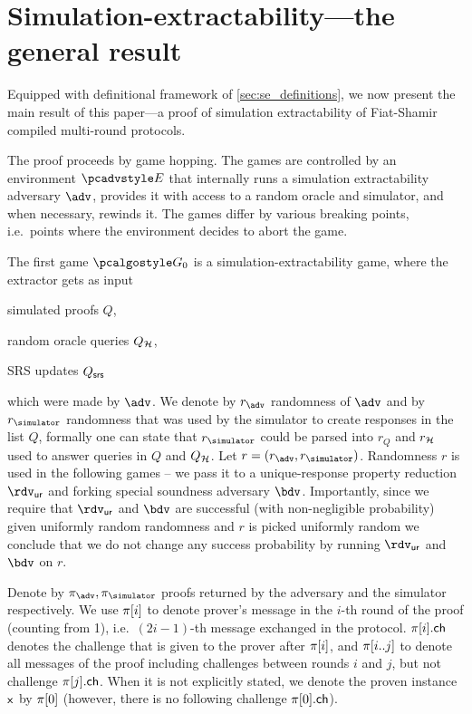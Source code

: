 \section{Simulation-extractability---the general result}
\label{sec:general}
Equipped with definitional framework of \cref{sec:se_definitions}, we now present the main result of this paper---a proof of
simulation extractability of Fiat-Shamir compiled multi-round protocols.

The proof proceeds by game hopping. The games are controlled by an environment $\env$
that internally runs a simulation extractability adversary $\advse$, provides it
with access to a random oracle and simulator, and when necessary, rewinds it. The
games differ by various breaking points, i.e.~points where the environment
decides to abort the game.

The first game $\game{0}$ is a simulation-extractability game, where the extractor
gets as input
\begin{inparaenum}[(1)]
\item simulated proofs $Q$,
\item random oracle queries $Q_{\mathcal{H}}$,
\item SRS updates $Q_{\mathsf{srs}}$
\end{inparaenum}
which were made by $\advse$.  We denote by $\radv$ randomness of $\advse$ and by
$\rsim$ randomness that was used by the simulator to create responses in the list
$Q$, formally one can state that $\rsim$ could be parsed into $r_Q$ and $r_{\mathcal{H}}$ used
to answer queries in $Q$ and $Q_{\mathcal{H}}$. Let $r = (\radv, \rsim)$. Randomness $r$ is
used in the following games -- we pass it to a unique-response property reduction $\rdvur$
and forking special soundness adversary $\bdv$. Importantly, since we require that
$\rdvur$ and $\bdv$ are successful (with non-negligible probability) given uniformly
random randomness and $r$ is picked uniformly random we conclude that we do not
change any success probability by running $\rdvur$ and $\bdv$ on $r$. 

Denote by $\zkproof_{\advse}, \zkproof_{\simulator}$ proofs returned by the
adversary and the simulator respectively. We use $\pi[i]$ to denote
prover's message in the $i$-th round of the proof (counting from 1),
i.e.~$(2i - 1)$-th message exchanged in the protocol. $\pi[i].\mathsf{ch}$ denotes
the challenge that is given to the prover after $\pi[i]$, and
$\pi[i..j]$ to denote all messages of the proof including challenges
between rounds $i$ and $j$, but not challenge $\pi[j].\mathsf{ch}$. When it is not
explicitly stated, we denote the proven instance $\mathsf{x}$ by $\pi[0]$
(however, there is no following challenge $\pi[0].\mathsf{ch}$).

